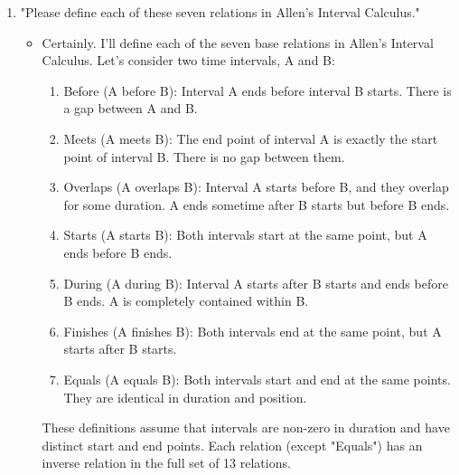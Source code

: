 \documentclass[11pt]{article}
\begin{document}
\begin{enumerate}
\begin{itemize}
\begin{enumerate}
          \item Before
          \item Meets
          \item Overlaps
          \item Starts
          \item During
          \item Finishes
          \item Equals
        \end{enumerate}
These 7 relations form the core of Allen's Interval Calculus. The other 6 relations in the full set of 13 are inverses of these (except for "Equals," which is its own inverse).
Would you like me to explain how these relations are defined or provide examples of their use in temporal reasoning?
    \end{itemize}
  \item "Please define each of these seven relations in Allen's Interval Calculus."
    \begin{itemize}
      \item Certainly. I'll define each of the seven base relations in Allen's Interval Calculus. Let's consider two time intervals, A and B:
        \begin{enumerate}
          \item Before (A before B):
            Interval A ends before interval B starts. There is a gap between A and B.
          \item Meets (A meets B):
            The end point of interval A is exactly the start point of interval B. There is no gap between them.
          \item Overlaps (A overlaps B):
            Interval A starts before B, and they overlap for some duration. A ends sometime after B starts but before B ends.
          \item Starts (A starts B):
            Both intervals start at the same point, but A ends before B ends.
          \item During (A during B):
            Interval A starts after B starts and ends before B ends. A is completely contained within B.
          \item Finishes (A finishes B):
            Both intervals end at the same point, but A starts after B starts.
          \item Equals (A equals B):
            Both intervals start and end at the same points. They are identical in duration and position.
        \end{enumerate}
        These definitions assume that intervals are non-zero in duration and have distinct start and end points. Each relation (except "Equals") has an inverse relation in the full set of 13 relations.

\end{itemize}
\end{enumerate}
\end{document}
